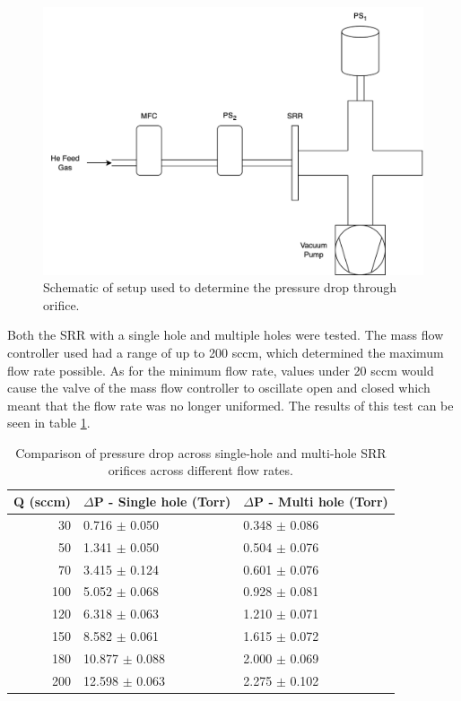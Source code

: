 \begin{figure}[h!]
	\centering
	\includegraphics[width=0.7\linewidth]{chapter_4/figures/pressure_drop_test.png}
	\caption{Schematic of setup used to determine the pressure drop through orifice.}
	\label{fig:pressure_drop_test}
\end{figure}

Both the SRR with a single hole and multiple holes were tested. The mass flow controller used had a range of up to 200 sccm, which determined the maximum flow rate possible. As for the minimum flow rate, values under 20 sccm would cause the valve of the mass flow controller to oscillate open and closed which meant that the flow rate was no longer uniformed. The results of this test can be seen in table \ref{tb:pressure_drop_results}.

\begin{table}[h!]
\centering
\caption{Comparison of pressure drop across single-hole and multi-hole SRR orifices across different flow rates.}
\begin{tabular}{rll}
Q (sccm) & $\Delta$P - Single hole (Torr) & $\Delta$P - Multi hole (Torr) \\
\hline
30               & 0.716 $\pm$ 0.050     & 0.348 $\pm$ 0.086    \\
50               & 1.341 $\pm$ 0.050     & 0.504 $\pm$ 0.076    \\
70               & 3.415 $\pm$ 0.124     & 0.601 $\pm$ 0.076    \\
100              & 5.052 $\pm$ 0.068     & 0.928 $\pm$ 0.081    \\
120              & 6.318 $\pm$ 0.063     & 1.210 $\pm$ 0.071    \\
150              & 8.582 $\pm$ 0.061     & 1.615 $\pm$ 0.072    \\
180              & 10.877 $\pm$ 0.088    & 2.000 $\pm$ 0.069    \\
200              & 12.598 $\pm$ 0.063    & 2.275 $\pm$ 0.102   
\end{tabular}
\label{tb:pressure_drop_results}
\end{table}


